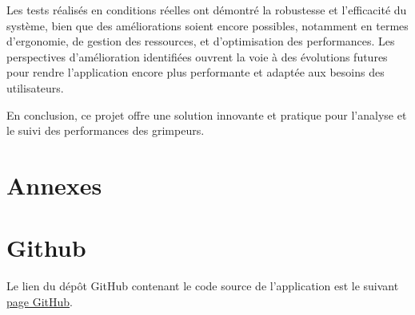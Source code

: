 \documentclass[a4paper, 11pt, french]{article}
\begin{document}
Les tests réalisés en conditions réelles ont démontré la robustesse et l'efficacité du système, bien que des améliorations soient encore possibles, notamment en termes d'ergonomie, de gestion des ressources, et d'optimisation des performances. Les perspectives d'amélioration identifiées ouvrent la voie à des évolutions futures pour rendre l'application encore plus performante et adaptée aux besoins des utilisateurs.

En conclusion, ce projet offre une solution innovante et pratique pour l'analyse et le suivi des performances des grimpeurs.



\clearpage
\newpage


\section*{Annexes}

\appendix

\startcontents[sections]


\section{Github}

Le lien du dépôt GitHub contenant le code source de l'application est le suivant \href{https://github.com/Romaiiin91/suiviGrimpeur_PDI}{page GitHub}.
      
\end{document}
